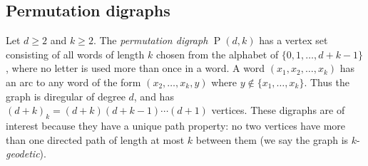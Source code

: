\documentclass[a4paper,12pt]{article}
\theoremstyle{definition}
\DeclareMathOperator{\Pe}{P}
\begin{document}
	\subsection{Permutation digraphs}
	
	Let $d\geq 2$ and $k\geq 2$. The \emph{permutation digraph} $\Pe(d,k)$ has a vertex set consisting of all words of length $k$ chosen from the alphabet of $\{ 0,1,\ldots ,d+k-1\} $, where no letter is used more than once in a word. A word $(x_1,x_2,\ldots,x_k)$ has an arc to any word of the form $(x_2,\ldots,x_k,y)$ where $y\notin\{x_1,\ldots,x_k\}$. Thus the graph is diregular of degree $d$, and has $(d+k)_k=(d+k)(d+k-1)\cdots(d+1)$ vertices. These digraphs are of interest because they have a unique path property: no two vertices have more than one directed path of length at most $k$ between them (we say the graph is $k$-\emph{geodetic}).
	
\end{document}
